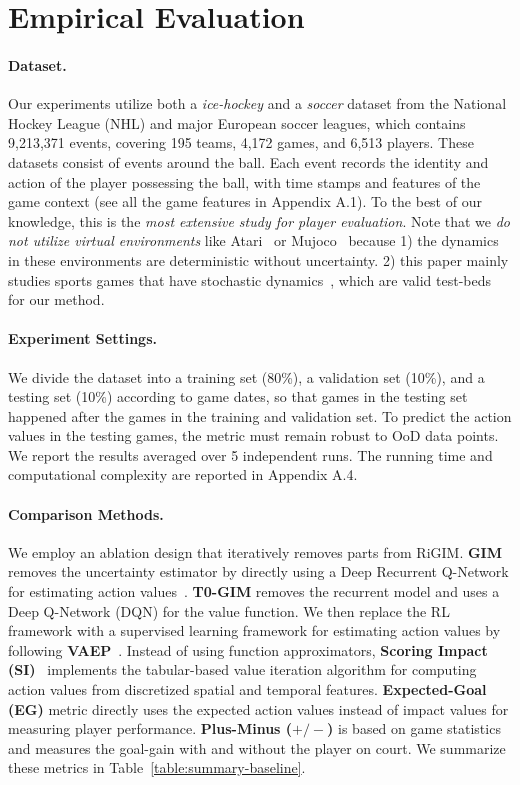 \documentclass[letterpaper]{article} %
\newcommand{\sys}{RiGIM}
\newcommand{\system}{\sys\;}
\begin{document}
\section{Empirical Evaluation}\label{Sec:experiment}

\paragraph{Dataset.} 
Our experiments utilize both a {\it ice-hockey} and a {\it soccer} dataset from the National Hockey League (NHL) and major European soccer leagues, which contains 9,213,371 events, covering 195 teams, 4,172 games, and 6,513 players. These datasets consist of events around the ball. Each event records the identity and action of the player possessing the ball, with time stamps and features of the game context (see all the game features in Appendix A.1). To the best of our knowledge, this is the {\it most extensive study for player evaluation}. Note that we {\it do not utilize virtual environments} like Atari~\cite{bellemare2013arcade} or Mujoco~\cite{Todorov2012Mujoco} because 1) the dynamics in these environments are deterministic without uncertainty. 2) this paper mainly studies sports games that have stochastic dynamics~\cite{schwartz2017handbook}, which are valid test-beds for our method.

\paragraph{Experiment Settings.} We divide the dataset into a training set (80\%), a validation set (10\%), and a testing set (10\%) according to game dates, so that games in the testing set happened after the games in the training and validation set. To predict the action values in the testing games, the metric must remain robust to OoD data points.
We report the results averaged over 5 independent runs. The running time and computational complexity are reported in Appendix A.4.

\paragraph{Comparison Methods.} We employ an ablation design that iteratively removes parts from \system.  {\bf GIM} removes the uncertainty estimator by directly using a Deep Recurrent Q-Network for estimating action values~\cite{Liu2018DRL}. {\bf T0-GIM} removes the recurrent model and uses a Deep Q-Network (DQN) for the value function. We then replace the RL framework with a supervised learning framework for estimating action values by following {\bf VAEP}~\cite{Decroos2019Actions}. Instead of using function approximators, {\bf Scoring Impact (SI)}~\cite{Routley2015Markov} implements the tabular-based value iteration algorithm for computing action values from discretized spatial and temporal features. {\bf Expected-Goal (EG)} metric directly uses the expected action values instead of impact values for measuring player performance. 
{\bf  Plus-Minus ($+/-$)}
is based on game statistics and measures the goal-gain with and without the player on court. We summarize these metrics in Table~\ref{table:summary-baseline}.
\end{document}
